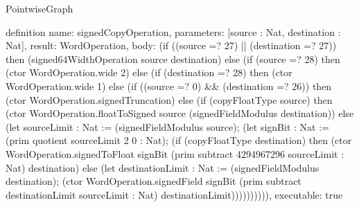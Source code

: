 \begin{lexlean}{PointwiseGraph}
\begin{semanticmodule}
definition{
  name: signedCopyOperation,
  parameters: [source : Nat, destination : Nat],
  result: WordOperation,
  body: (if ((source =? 27) || (destination =? 27)) then (signed64WidthOperation source destination) else (if (source =? 28) then (ctor WordOperation.wide 2) else (if (destination =? 28) then (ctor WordOperation.wide 1) else (if ((source =? 0) && (destination =? 26)) then (ctor WordOperation.signedTruncation) else (if (copyFloatType source) then (ctor WordOperation.floatToSigned source (signedFieldModulus destination)) else (let sourceLimit : Nat := (signedFieldModulus source); (let signBit : Nat := (prim quotient sourceLimit 2 0 : Nat); (if (copyFloatType destination) then (ctor WordOperation.signedToFloat signBit (prim subtract 4294967296 sourceLimit : Nat) destination) else (let destinationLimit : Nat := (signedFieldModulus destination); (ctor WordOperation.signedField signBit (prim subtract destinationLimit sourceLimit : Nat) destinationLimit)))))))))),
  executable: true
}


\end{semanticmodule}
\end{lexlean}

